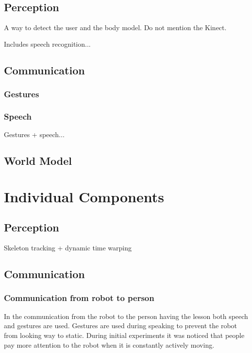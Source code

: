 \documentclass[10pt,a4paper,oneside]{scrartcl}
\begin{document}
\subsection{Perception}
A way to detect the user and the body model. Do not mention the Kinect.

Includes speech recognition...


\subsection{Communication}


\subsubsection{Gestures}

\subsubsection{Speech}
Gestures + speech...

\subsection{World Model}



\section{Individual Components}

\subsection{Perception}
Skeleton tracking + dynamic time warping

\subsection{Communication}

\subsubsection{Communication from robot to person}
In the communication from the robot to the person having the lesson both speech and gestures are used. 
Gestures are used during speaking to prevent the robot from looking way to static. 
During initial experiments it was noticed that people pay more attention to the robot when it is constantly actively moving. 
\end{document}

